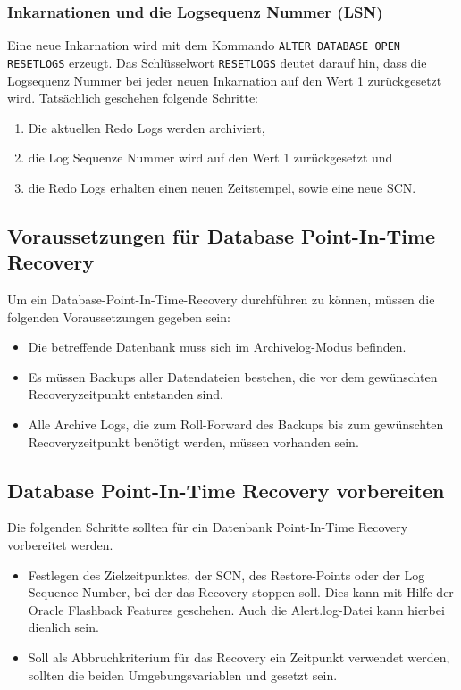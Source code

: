         \subsubsection{Inkarnationen und die Logsequenz Nummer (LSN)}
          Eine neue Inkarnation wird mit dem Kommando \lstinline[language=oracle_sql]{ALTER DATABASE OPEN RESETLOGS} erzeugt. Das Schlüsselwort \lstinline[language=oracle_sql]{RESETLOGS} deutet darauf hin, dass die Logsequenz Nummer bei jeder neuen Inkarnation auf den Wert 1 zurückgesetzt wird. Tatsächlich geschehen folgende Schritte:
          \begin{enumerate}
            \item Die aktuellen Redo Logs werden archiviert,
            \item die Log Sequenze Nummer wird auf den Wert 1 zurückgesetzt und
            \item die Redo Logs erhalten einen neuen Zeitstempel, sowie eine neue SCN.
          \end{enumerate}
      \subsection{Voraussetzungen für Database Point-In-Time Recovery}
        Um ein Database-Point-In-Time-Recovery durchführen zu können, müssen die folgenden Voraussetzungen gegeben sein:
        \begin{itemize}
          \item Die betreffende Datenbank muss sich im Archivelog-Modus befinden.
          \item Es müssen Backups aller Datendateien bestehen, die vor dem gewünschten Reco\-very\-zeit\-punkt entstanden sind.
          \item Alle Archive Logs, die zum Roll-Forward des Backups bis zum gewünschten Reco\-very\-zeit\-punkt benötigt werden, müssen vorhanden sein.
        \end{itemize}
      \subsection{Database Point-In-Time Recovery vorbereiten}
        Die folgenden Schritte sollten für ein Datenbank Point-In-Time Recovery vorbereitet werden.
        \begin{itemize}
          \item Festlegen des Zielzeitpunktes, der SCN, des Restore-Points oder der Log Sequence Number, bei der das Recovery stoppen soll. Dies kann mit Hilfe der Oracle Flashback Features geschehen. Auch die Alert.log-Datei kann hierbei dienlich sein.
          \item Soll als Abbruchkriterium für das Recovery ein Zeitpunkt verwendet werden, sollten die beiden Umgebungsvariablen  und  gesetzt sein.
        \end{itemize}
